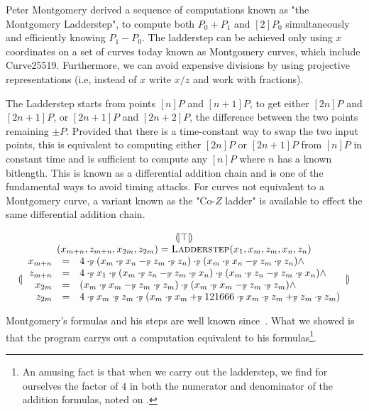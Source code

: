 Peter Montgomery derived a sequence of computations known
as "the Montgomery Ladderstep", to compute both $P_0+P_1$ and $[2]P_0$
simultaneously and efficiently knowing $P_1-P_0$.  The ladderstep can
be achieved only using $x$ coordinates on a set of curves today known as
Montgomery curves, which include Curve25519.  Furthermore, we can
avoid expensive divisions by using projective representations (i.e,
instead of $x$ write $x/z$ and work  with fractions).  

The Ladderstep starts from points $[n]P $ and
$[n+1]P $, to get either $ [2n]P $ and
$[2n+1]P$, or $[2n+1]P$ and $[2n+2]P$, the difference between the two points remaining $\pm P$.  Provided that there is a time-constant way to swap the two input
points, this
is equivalent to computing either $[2n]P$ or $[2n+1]P$
from $[n]P$ in constant
time and is sufficient to compute any $[n]P$ where
$n$ has a known bitlength.  This is known as a differential
addition chain and is one of the fundamental ways to avoid timing
attacks.  For curves not equivalent to a Montgomery curve, a variant
known as the "Co-$Z$ ladder" is available to effect the same
differential addition chain.

\[
\begin{array}{c}
  {(\!|}{\top}{|\!)}\\
  (x_{m+n}, z_{m+n}, x_{2m}, z_{2m})=\textsc{Ladderstep}(x_1, x_m, z_m, x_n, z_n)\\
  {(\!|}{
  \begin{array}{rcl}
    x_{m+n} & = & 4 \cdot_{\mathbb{F}} (x_m \cdot_{\mathbb{F}} x_n -_{\mathbb{F}} z_m \cdot_{\mathbb{F}} z_n)
               \cdot_{\mathbb{F}} (x_m \cdot_{\mathbb{F}} x_n -_{\mathbb{F}} z_m \cdot_{\mathbb{F}} z_n) \wedge \\
    z_{m+n} & = & 4 \cdot_{\mathbb{F}} x_1 \cdot_{\mathbb{F}} (x_m \cdot_{\mathbb{F}} z_n -_{\mathbb{F}} z_m \cdot_{\mathbb{F}} x_n)
               \cdot_{\mathbb{F}} (x_m \cdot_{\mathbb{F}} z_n -_{\mathbb{F}} z_m \cdot_{\mathbb{F}} x_n) \wedge \\
    x_{2m} & = & (x_m \cdot_{\mathbb{F}} x_m -_{\mathbb{F}} z_m \cdot_{\mathbb{F}} z_m) \cdot_{\mathbb{F}}
                (x_m \cdot_{\mathbb{F}} x_m -_{\mathbb{F}} z_m \cdot_{\mathbb{F}} z_m) \wedge \\
    z_{2m} & = & 4 \cdot_{\mathbb{F}} x_m \cdot_{\mathbb{F}} z_m \cdot_{\mathbb{F}}
                (x_m \cdot_{\mathbb{F}} x_m +_{\mathbb{F}} 121666 \cdot_{\mathbb{F}} x_m \cdot_{\mathbb{F}} z_m +_{\mathbb{F}}
                 z_m \cdot_{\mathbb{F}} z_m)
  \end{array}
  }{|\!)}
  
\end{array}
\]

Montgomery's formulas and his steps are well known
since~\cite{M:87:SPEC}.  What we showed is that the program carrys out
a computation equivalent to his formulas\footnote{An amusing fact is
  that when we carry out the ladderstep, we find for ourselves the factor of $4$
  in both the numerator and denominator of the addition formulas, 
  noted on \cite[p.~261]{M:87:SPEC}.}.

